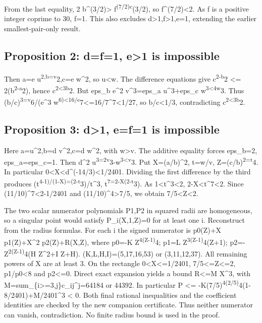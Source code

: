 \documentclass[
  10pt,
]{article}
\begin{document}
From the last equality, 2 b\^{}(3/2)\textgreater{}
f\textsuperscript{(7/2)c}(3/2), so f\^{}(7/2)\textless2. As f is a
positive integer coprime to 30, f=1. This also excludes
d\textgreater1,f\textgreater1,e=1, extending the earlier
smallest-pair-only result.

\subsection{Proposition 2: d=f=1, e\textgreater1 is
impossible}\label{proposition-2-df1-e1-is-impossible}

Then a=e u\textsuperscript{2,b=v}2,c=e w\^{}2, so u\textless w. The
difference equations give c\textsuperscript{2-b}2 \textless=
2(b\textsuperscript{2-a}2), hence c\textsuperscript{2\textless3b}2. But
eps\_b e\^{}2 v\^{}3=eps\_a u\^{}3+eps\_c
w\textsuperscript{3\textless4w}3. Thus
(b/c)\textsuperscript{3=v}6/(e\^{}3
w\textsuperscript{6)\textless16/e}7\textless=16/7\^{}7\textless1/27, so
b/c\textless1/3, contradicting c\textsuperscript{2\textless3b}2.

\subsection{Proposition 3: d\textgreater1, e=f=1 is
impossible}\label{proposition-3-d1-ef1-is-impossible}

Here a=u\^{}2,b=d v\^{}2,c=d w\^{}2, with w\textgreater v. The additive
equality forces eps\_b=2, eps\_a=eps\_c=1. Then d\^{}2
u\textsuperscript{3=2v}3-w\textsuperscript{3\textless v}3. Put
X=(a/b)\^{}2, t=w/v, Z=(c/b)\textsuperscript{2=t}4. In particular
0\textless X\textless d\^{}(-14/3)\textless1/2401. Dividing the first
difference by the third produces
(t\textsuperscript{4-1)/(1-X)=(2-t}3)/t\^{}3,
t\textsuperscript{7=2-X(2-t}3). As 1\textless t\^{}3\textless2,
2-X\textless t\^{}7\textless2. Since (11/10)\^{}7\textless2-1/2401 and
(11/10)\^{}4\textgreater7/5, we obtain 7/5\textless Z\textless2.

The two scalar numerator polynomials P1,P2 in squared radii are
homogeneous, so a singular point would satisfy P\_i(X,1,Z)=0 for at
least one i. Reconstruct from the radius formulas. For each i the signed
numerator is p0(Z)+X p1(Z)+X\^{}2 p2(Z)+R(X,Z), where p0=-K
Z\textsuperscript{4(Z-1)}4; p1=L Z\textsuperscript{3(Z-1)}4(Z+1);
p2=-Z\textsuperscript{2(Z-1)}4(H Z\^{}2+I Z+H). (K,L,H,I)=(5,17,16,53)
or (3,11,12,37). All remaining powers of X are at least 3. On the
rectangle 0\textless X\textless=1/2401, 7/5\textless=Z\textless=2,
p1/\textbar p0\textbar\textless8 and p2\textless=0. Direct exact
expansion yields a bound \textbar R\textbar\textless=M X\^{}3, with
M=sum\_\{i\textgreater=3,j\}\textbar c\_ij\^{}j=64184 or 44392.
In particular P \textless=
-K(7/5)\textsuperscript{4(2/5)}4(1-8/2401)+M/2401\^{}3 \textless{} 0.
Both final rational inequalities and the coefficient identities are
checked by the new companion certificate. Thus neither numerator can
vanish, contradiction. No finite radius bound is used in the proof.
\end{document}

